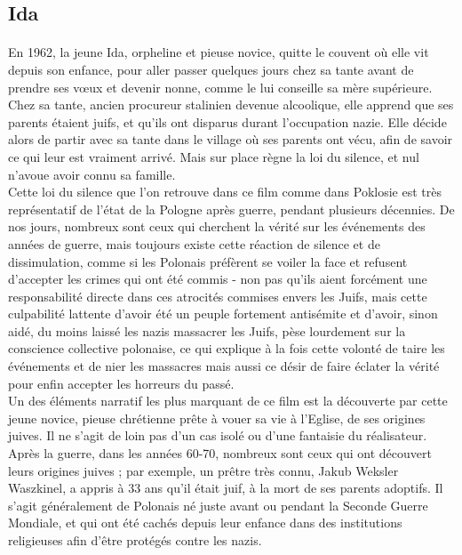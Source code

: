 \documentclass[12pt]{amsart}
\begin{document}
\subsection*{Ida}
\paragraph{}
En 1962, la jeune Ida, orpheline et pieuse novice, quitte le couvent où elle vit depuis son enfance, pour aller passer quelques jours chez sa tante avant de prendre ses vœux et devenir nonne, comme le lui conseille sa mère supérieure. Chez sa tante, ancien procureur stalinien devenue alcoolique, elle apprend que ses parents étaient juifs, et qu'ils ont disparus durant l’occupation nazie. Elle décide alors de partir avec sa tante dans le village où ses parents ont vécu, afin de savoir ce qui leur est vraiment arrivé. Mais sur place règne la loi du silence, et nul n’avoue avoir connu sa famille. \\
Cette loi du silence que l'on retrouve dans ce film comme dans Poklosie est très représentatif de l'état de la Pologne après guerre, pendant plusieurs décennies. De nos jours, nombreux sont ceux qui cherchent la vérité sur les événements des années de guerre, mais toujours existe cette réaction de silence et de dissimulation, comme si les Polonais préfèrent se voiler la face et refusent d'accepter les crimes qui ont été commis - non pas qu'ils aient forcément une responsabilité directe dans ces atrocités commises envers les Juifs, mais cette culpabilité lattente d'avoir été un peuple fortement antisémite et d'avoir, sinon aidé, du moins laissé les nazis massacrer les Juifs, pèse lourdement sur la conscience collective polonaise, ce qui explique à la fois cette volonté de taire les événements et de nier les massacres mais aussi ce désir de faire éclater la vérité pour enfin accepter les horreurs du passé.\\
Un des éléments narratif les plus marquant de ce film est la découverte par cette jeune novice, pieuse chrétienne prête à vouer sa vie à l'Eglise, de ses origines juives. Il ne s'agit de loin pas d'un cas isolé ou d'une fantaisie du réalisateur. Après la guerre, dans les années 60-70, nombreux sont ceux qui ont découvert leurs origines juives ; par exemple, un prêtre très connu, Jakub Weksler Waszkinel, a appris à 33 ans qu'il était juif, à la mort de ses parents adoptifs. Il s'agit généralement de Polonais né juste avant ou pendant la Seconde Guerre Mondiale, et qui ont été cachés depuis leur enfance dans des institutions religieuses afin d'être protégés contre les nazis. \\
\end{document}
